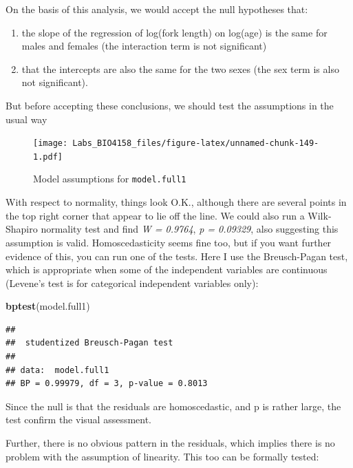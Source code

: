\documentclass[
  12pt,
]{book}
\newenvironment{Shaded}{\begin{snugshade}}{\end{snugshade}}
\newcommand{\KeywordTok}[1]{\textcolor[rgb]{0.13,0.29,0.53}{\textbf{#1}}}
\newcommand{\NormalTok}[1]{#1}
\providecommand{\tightlist}{%
  \setlength{\itemsep}{0pt}\setlength{\parskip}{0pt}}
\begin{document}
On the basis of this analysis, we would accept the null hypotheses that:

\begin{enumerate}
\def\labelenumi{\arabic{enumi}.}
\tightlist
\item
  the slope of the regression of log(fork length) on log(age) is the same for males and females (the interaction term is not significant)
\item
  that the intercepts are also the same for the two sexes (the sex term is also not significant).
\end{enumerate}

But before accepting these conclusions, we should test the assumptions in the usual way

\begin{figure}
\centering
\texttt{[image: Labs\_BIO4158\_files/figure-latex/unnamed-chunk-149-1.pdf]}
\caption{\label{fig:unnamed-chunk-149}Model assumptions for \texttt{model.full1}}
\end{figure}

With respect to normality, things look O.K., although there are several points in the top right corner that appear to lie off the line. We could also run a Wilk-Shapiro normality test and find \emph{W = 0.9764}, \emph{p = 0.09329}, also suggesting this assumption is valid. Homoscedasticity seems fine too, but if you want further evidence of this, you can run one of the tests. Here I use the Breusch-Pagan test, which is appropriate when some of the independent variables are continuous (Levene's test is for categorical independent variables only):

\begin{Shaded}
\begin{Highlighting}[]
\KeywordTok{bptest}\NormalTok{(model.full1)}
\end{Highlighting}
\end{Shaded}

\begin{verbatim}
## 
##  studentized Breusch-Pagan test
## 
## data:  model.full1
## BP = 0.99979, df = 3, p-value = 0.8013
\end{verbatim}

Since the null is that the residuals are homoscedastic, and p is rather large, the test confirm the visual assessment.

Further, there is no obvious pattern in the residuals, which implies there is no problem with the assumption of linearity. This too can be formally tested:
\end{document}
